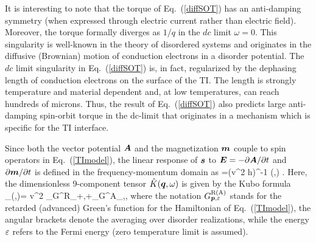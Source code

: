 It is interesting to note that the torque of Eq.~(\ref{diffSOT}) has an anti-damping symmetry (when expressed through electric current rather than electric field). Moreover, the torque formally diverges as $1/q$ in the $dc$ limit $\omega=0$. This singularity is well-known in the theory of disordered systems \cite{maleev1975corrections,maleev1976corrections,altshuler1985electron} and originates in the diffusive (Brownian) motion of conduction electrons in a disorder potential.  The $dc$ limit singularity in Eq.~(\ref{diffSOT}) is, in fact, regularized by the dephasing length of conduction electrons on the surface of the TI. The length is strongly temperature and material dependent and, at low temperatures, can reach hundreds of microns. Thus, the result of Eq.~(\ref{diffSOT}) also predicts large anti-damping spin-orbit torque in the dc-limit that originates in a mechanism which is specific for the TI interface. 


Since both the vector potential $\boldsymbol{A}$ and the magnetization $\boldsymbol{m}$ couple to spin operators in Eq.~(\ref{TImodel}), the linear response of $\boldsymbol{s}$ to $\boldsymbol{E}=-\partial\boldsymbol{A}/{\partial t}$ and $\partial \boldsymbol{m}/\partial t$ is defined in the frequency-momentum domain as 
\be
\label{spol}
 =(v^2 h)^{-1} (,\omega) .
\e
Here, the dimensionless 9-component tensor $\hat{K}(\boldsymbol{q},\omega)$ is given by the Kubo formula 
\be
\label{Kubo}
_{\alpha\beta}(,\omega)= {v^2}\!\!\int\!\! 
\tr \lt\la \sigma_\alpha G^\textrm{R}_{+\hslash {},{\ep+\hslash\omega}}\sigma_\beta G^\textrm{A}_{,\ep}\rt \ra,
\e
where the notation $G^{\textrm{R(A)}}_{\boldsymbol{p},\varepsilon}$ stands for the retarded (advanced) Green's function for the Hamiltonian of Eq.~(\ref{TImodel}), the angular brackets denote the averaging over disorder realizations, while the energy $\varepsilon$ refers to the Fermi energy (zero temperature limit is assumed). 

